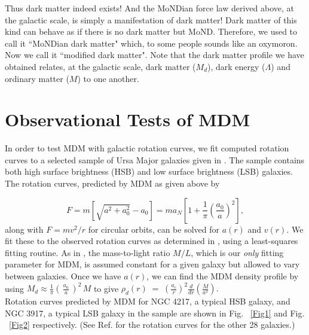 \documentclass[a4paper]{jpconf}
\begin{document}
Thus dark matter indeed exists!
And the MoNDian force law derived above, at the galactic scale, is 
simply a manifestation of dark matter! \cite{HMN,turnerkip}
Dark matter of this kind can behave as if there is no dark
matter but MoND. Therefore, we used to call it ``MoNDian dark matter" 
which, to some people sounds like an oxymoron.  Now we call it
``modified dark matter".
Note that the dark matter profile we have obtained relates, at the 
galactic scale,
dark matter ($M_d$), dark energy ($\Lambda$) and ordinary matter
($M$) to one another.\\

%

\section{\bf Observational Tests of MDM}

In order to test MDM with galactic rotation curves, we fit computed rotation 
curves to a selected sample of Ursa Major galaxies given in \cite{Sanders98}. 
The sample contains both high surface brightness (HSB) and low surface 
brightness (LSB) galaxies. The rotation curves, predicted by MDM 
as given above by 

\begin{equation}
F =  m [\sqrt{a^2+a_0^2}-a_0]
  = m a_N \left[ 1 + \frac{1}{\pi} \left( \frac{a_0}{a} \right)^2 \right],
\end{equation}
along with $ F = m v^2 / r$ for circular orbits, can be
solved for $a(r)$ and $v(r)$. We \cite{Edm1}
fit these to the observed rotation curves as determined in \cite{Sanders98}, 
using a least-squares fitting routine. As in \cite{Sanders98}, the mass-to-light 
ratio $M/L$, which is our {\it only} fitting parameter for MDM, is assumed 
constant for a given galaxy but allowed to vary between galaxies. Once we have 
$a(r)$, we can find the MDM density profile by using $M_d \approx 
\frac{1}{\pi} 
\left(\,\frac{a_0}{a}\,\right)^2\, M$
to give
$
\rho_d (r) \;=\; \left( \frac{a_c}{r} \right)^2 \frac{d}{dr} \left( 
\frac{M}{a^2} 
\right).
$
\\

Rotation curves predicted by MDM for NGC 4217, a typical HSB galaxy, and NGC 
3917, a typical LSB galaxy in the sample
are shown in Fig. ~\ref{Fig1} and Fig. ~\ref{Fig2} respectively. 
(See Ref. \cite{Edm1} for the rotation curves for the other 28 galaxies.)
\end{document}
